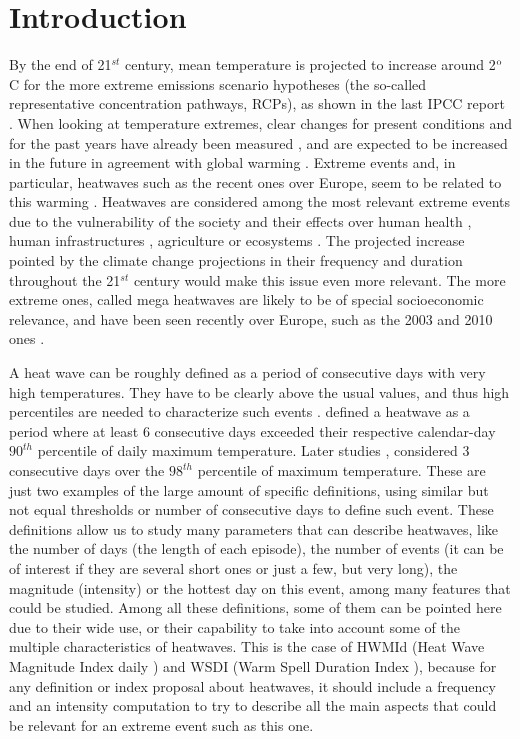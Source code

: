 \section{Introduction}

By the end of 21$^{st}$ century, mean 
temperature is projected to increase around 2$^{\rm{o}}$C for the more
extreme emissions scenario hypotheses (the so-called representative
concentration pathways, RCPs), as shown in the last IPCC report \cite{sto2014}.
When looking at temperature extremes, clear changes for present
conditions and for the past years have already been measured \cite{don_al2013}, and 
are expected to be increased in the future in agreement with 
global warming \cite{sen_al2012,Car_al2018}. Extreme events
and, in particular, heatwaves such as the recent ones over Europe,
seem to be related to this warming \cite{ben_al2017}. Heatwaves are considered among the most relevant extreme events due to the vulnerability of the society and their effects over human health \cite{dun_al2013,ame_al2014,roh_al2018}, human infrastructures
\cite{col_al1999,mce_al2012}, agriculture \cite{bar_al2011} or
ecosystems \cite{sto2014,hob_al2016}. The projected increase pointed  by the climate change projections in their frequency 
and duration throughout the 21$^{st}$ century \cite{fri_al2002,bal_al2010,sto2014,hor_al2016}
would make this issue even more relevant.
The more extreme ones, called mega heatwaves are likely to be
of special socioeconomic relevance, and have been seen recently 
over Europe, such as the 2003 and 2010 ones \cite{bar_al2011}. 

A heat wave can be roughly defined as a period of consecutive days with very high temperatures. They have to be clearly above the usual values, and thus high percentiles are needed
to characterize such events \cite{per2015}. \cite{fis_sch2010} defined a  heatwave as a period where at least 6 consecutive days exceeded their respective calendar-day $90^{th}$ percentile of daily maximum temperature. 
Later studies \cite{sch_al2015}, considered 3 consecutive days 
over the $98^{th}$ percentile of maximum temperature. These are just two examples of the large amount of specific definitions, using similar but not equal thresholds or number of consecutive days to define such event.
These definitions allow us to study many parameters that can describe heatwaves, like the number of days (the length of each episode), the number  of events (it can be of interest if they are several short ones or just a few, but very long), the magnitude (intensity) or the hottest day on this event, among many features that could be studied. Among all these definitions,
some of them can be pointed here due to their wide use, or their capability to take into account some of the multiple characteristics of heatwaves. This is the case of HWMId (Heat Wave Magnitude Index daily \cite{rus_al2015}) and
WSDI (Warm Spell Duration Index \cite{zha_al2011}), because for any definition or
index proposal about heatwaves, it should include a frequency and an intensity computation to try to describe all the main aspects that
could be relevant for an extreme event such as this one.

